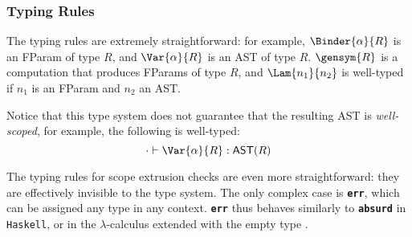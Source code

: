 


\subsubsection{Typing Rules}
The \sourceLang{} typing rules are extremely straightforward: for example, $\Binder{\alpha}{R}$ is an \textsf{FParam} of type $R$, and $\Var{\alpha}{R}$ is an \textsf{AST} of type $R$. $\gensym{R}$ is a computation that produces \textsf{FParam}s of type $R$, and $\Lam{n_1}{n_2}$ is well-typed if $n_1$ is an \textsf{FParam} and $n_2$ an AST. 

Notice that this type system does not guarantee that the resulting AST is \textit{well-scoped}, for example, the following is well-typed:
\[\cdot \vdash {\Var{\alpha}{R}}: {\textsf{AST}(R)}\]

The typing rules for scope extrusion checks are even more straightforward: they are effectively invisible to the type system. The only complex case is \textbf{\texttt{err}}, which can be assigned any type in any context. \textbf{\texttt{err}} thus behaves similarly to \textbf{\texttt{absurd}} in \texttt{Haskell}, or in the $\lambda$-calculus extended with the empty type \citep{scherer-2017}.

